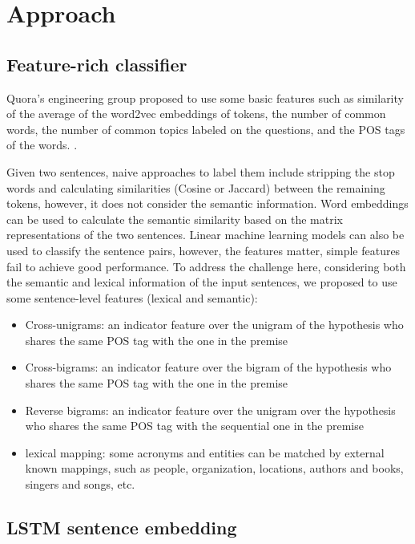 \documentclass[11pt,a4paper]{article}
\begin{document}
\section{Approach}
 \subsection{Feature-rich classifier}
Quora's engineering group proposed to use some basic features such as similarity of the average of the word2vec embeddings of tokens, the number of common words, the number of common topics labeled on the questions, and the POS tags of the words. \cite{nikhil2017quora}.

Given two sentences, naive approaches to label them include stripping the stop words and calculating similarities (Cosine or Jaccard) between the remaining tokens, however, it does not consider the semantic information. Word embeddings can be used to calculate the semantic similarity based on the matrix representations of the two sentences. Linear machine learning models can also be used to classify the sentence pairs, however, the features matter, simple features fail to achieve good performance.  To address the challenge here, considering both the semantic and lexical information of the input sentences, we proposed to use some sentence-level features (lexical and semantic):
\begin{itemize}
    \item Cross-unigrams: an indicator feature over the unigram of the hypothesis who shares the same POS tag with the one in the premise
    \item Cross-bigrams: an indicator feature over the bigram of the hypothesis who shares the same POS tag with the one in the premise 
    \item Reverse bigrams: an indicator feature over the unigram over the hypothesis who shares the same POS tag with the sequential one in the premise
    \item lexical mapping: some acronyms and entities can be matched by external known mappings, such as people, organization, locations, authors and books, singers and songs, etc.
\end{itemize}

\subsection{LSTM sentence embedding}
\end{document}
